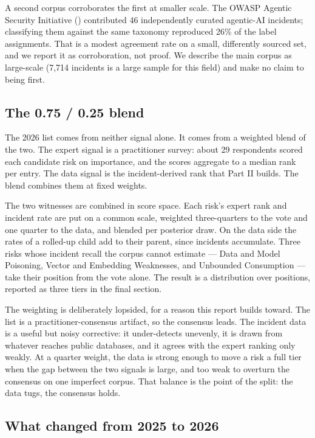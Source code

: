 \documentclass[11pt]{article}
\begin{document}
A second corpus corroborates the first at smaller scale. The OWASP
Agentic Security Initiative () contributed 46 independently curated agentic-AI
incidents; classifying them against the same taxonomy reproduced 26\% of
the label assignments. That is a modest agreement rate on a small,
differently sourced set, and we report it as corroboration, not proof.
We describe the main corpus as large-scale (7,714 incidents is a large
sample for this field) and make no claim to being first.

\subsection{The 0.75 / 0.25 blend}\label{the-0.75-0.25-blend}

The 2026 list comes from neither signal alone. It comes from a weighted
blend of the two. The expert signal is a practitioner survey: about 29
respondents scored each candidate risk on importance, and the scores
aggregate to a median rank per entry. The data signal is the
incident-derived rank that Part II builds. The blend combines them at
fixed weights.

The two witnesses are combined in score space. Each risk's expert rank
and incident rate are put on a common scale, weighted three-quarters to
the vote and one quarter to the data, and blended per posterior draw. On
the data side the rates of a rolled-up child add to their parent, since
incidents accumulate. Three risks whose incident recall the corpus
cannot estimate --- Data and Model Poisoning, Vector and Embedding
Weaknesses, and Unbounded Consumption --- take their position from the
vote alone. The result is a distribution over positions, reported as
three tiers in the final section.

The weighting is deliberately lopsided, for a reason this report builds
toward. The list is a practitioner-consensus artifact, so the consensus
leads. The incident data is a useful but noisy corrective: it
under-detects unevenly, it is drawn from whatever reaches public
databases, and it agrees with the expert ranking only weakly. At a
quarter weight, the data is strong enough to move a risk a full tier
when the gap between the two signals is large, and too weak to overturn
the consensus on one imperfect corpus. That balance is the point of the
split: the data tugs, the consensus holds.

\subsection{What changed from 2025 to
2026}\label{what-changed-from-2025-to-2026}
\end{document}
